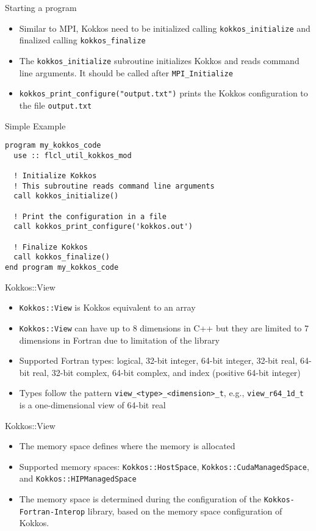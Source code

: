 \begin{frame}{Starting a program}
  \begin{itemize}
    \item Similar to MPI, Kokkos need to be initialized calling
      \texttt{kokkos\_initialize} and finalized calling \texttt{kokkos\_finalize}
    \item The \texttt{kokkos\_initialize} subroutine initializes Kokkos and
      reads command line arguments. It should be called after
      \texttt{MPI\_Initialize}
    \item \texttt{kokkos\_print\_configure("output.txt")} prints the
      Kokkos configuration to the file \texttt{output.txt}
  \end{itemize}
\end{frame}

\begin{frame}[containsverbatim]{Simple Example}
  \begin{verbatim}
program my_kokkos_code
  use :: flcl_util_kokkos_mod

  ! Initialize Kokkos
  ! This subroutine reads command line arguments
  call kokkos_initialize()

  ! Print the configuration in a file
  call kokkos_print_configure('kokkos.out')

  ! Finalize Kokkos
  call kokkos_finalize()
end program my_kokkos_code
  \end{verbatim}
\end{frame}

\begin{frame}{Kokkos::View}
  \begin{itemize}
    \item \texttt{Kokkos::View} is Kokkos equivalent to an array
    \item \texttt{Kokkos::View} can have up to 8 dimensions in C++ but they are
      limited to 7 dimensions in Fortran due to limitation of the library
    \item Supported Fortran types: logical, 32-bit integer, 64-bit
      integer, 32-bit real, 64-bit real, 32-bit complex, 64-bit complex, and
      index (positive 64-bit integer)
    \item Types follow the pattern \texttt{view\_<type>\_<dimension>\_t}, e.g.,
      \texttt{view\_r64\_1d\_t} is a one-dimensional view of 64-bit real
  \end{itemize}
\end{frame}

\begin{frame}{Kokkos::View}
  \begin{itemize}
    \item The memory space defines where the memory is allocated
    \item Supported memory spaces: \texttt{Kokkos::HostSpace},
      \texttt{Kokkos::CudaManagedSpace}, and \texttt{Kokkos::HIPManagedSpace}
    \item The memory space is determined during the configuration of the
      \texttt{Kokkos-Fortran-Interop} library, based on the memory space
      configuration of Kokkos.
  \end{itemize}
\end{frame}

